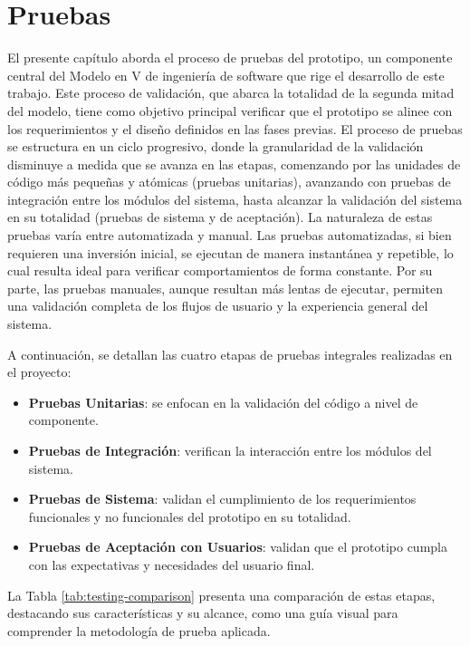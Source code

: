 \chapter[Pruebas]{Pruebas}
\label{cp:testing}

\parindent0pt

El presente capítulo aborda el proceso de pruebas del prototipo, un componente central del Modelo en V de ingeniería de software que rige el desarrollo de este trabajo. Este proceso de validación, que abarca la totalidad de la segunda mitad del modelo, tiene como objetivo principal verificar que el prototipo se alinee con los requerimientos y el diseño definidos en las fases previas. El proceso de pruebas se estructura en un ciclo progresivo, donde la granularidad de la validación disminuye a medida que se avanza en las etapas, comenzando por las unidades de código más pequeñas y atómicas (pruebas unitarias), avanzando con pruebas de integración entre los módulos del sistema, hasta alcanzar la validación del sistema en su totalidad (pruebas de sistema y de aceptación). La naturaleza de estas pruebas varía entre automatizada y manual. Las pruebas automatizadas, si bien requieren una inversión inicial, se ejecutan de manera instantánea y repetible, lo cual resulta ideal para verificar comportamientos de forma constante. Por su parte, las pruebas manuales, aunque resultan más lentas de ejecutar, permiten una validación completa de los flujos de usuario y la experiencia general del sistema.

A continuación, se detallan las cuatro etapas de pruebas integrales realizadas en el proyecto:

\begin{itemize}
\item \textbf{Pruebas Unitarias}: se enfocan en la validación del código a nivel de componente.
\item \textbf{Pruebas de Integración}: verifican la interacción entre los módulos del sistema.
\item \textbf{Pruebas de Sistema}: validan el cumplimiento de los requerimientos funcionales y no funcionales del prototipo en su totalidad.
\item \textbf{Pruebas de Aceptación con Usuarios}: validan que el prototipo cumpla con las expectativas y necesidades del usuario final.
\end{itemize}

La Tabla \ref{tab:testing-comparison} presenta una comparación de estas etapas, destacando sus características y su alcance, como una guía visual para comprender la metodología de prueba aplicada.

